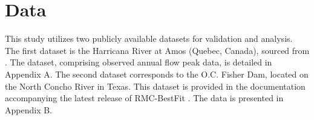 \section{Data}
This study utilizes two publicly available datasets for validation and analysis. The first dataset is the Harricana River at Amos (Quebec, Canada), sourced from \citep{Bobee_1991, Smith_2020b}. The dataset, comprising observed annual flow peak data, is detailed in Appendix A. The second dataset corresponds to the O.C. Fisher Dam, located on the North Concho River in Texas. This dataset is provided in the documentation accompanying the latest release of RMC-BestFit \citep{Smith_2024}. The data is presented in Appendix B.

\FloatBarrier
